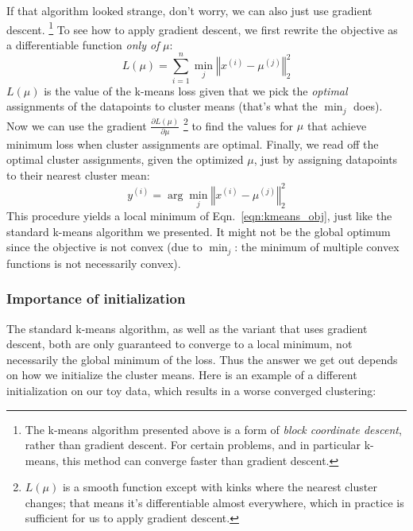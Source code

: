 \documentclass[11pt]{article}
\newcommand{\anchorednote}[2]{ #1 \note{#2} }	%
\newcommand{\note}[1]{\todo[color=blue!10,
  linecolor=blue!90,size=\small]{\linespread{0.9}\selectfont{#1}\par}}
\renewcommand{\note}[1]{\footnote{#1}}
\begin{document}
If that algorithm looked strange, don't worry, we can also just use\anchorednote{gradient descent.}{The k-means algorithm presented above is a form of \textit{block coordinate descent}, rather than gradient descent. For certain problems, and in particular k-means, this method can converge faster than gradient descent.} To see how to apply gradient descent, we first rewrite the objective as a differentiable function \textit{only of} $\mu$:
\begin{equation}
    L(\mu) = \sum_{i=1}^n \min_j \left\Vert x^{(i)} - \mu^{(j)} \right\Vert^2_2
\end{equation}
$L(\mu)$ is the value of the k-means loss given that we pick the \textit{optimal} assignments of the datapoints to cluster means (that's what the $\min_j$ does). Now we can use the gradient\anchorednote{$\frac{\partial L(\mu)}{\partial \mu}$}{$L(\mu)$ is a smooth function except with kinks where the nearest cluster changes; that means it's differentiable almost everywhere, which in practice is sufficient for us to apply gradient descent.} to find the values for $\mu$ that achieve minimum loss when cluster assignments are optimal.
Finally, we read off the optimal cluster assignments, given the optimized $\mu$, just by assigning datapoints to their nearest cluster mean:
\begin{equation}
    y^{(i)} = \arg\min_j \left\Vert x^{(i)} - \mu^{(j)} \right\Vert^2_2
\end{equation}
This procedure yields a local minimum of Eqn.~\ref{eqn:kmeans_obj}, just like the standard k-means algorithm we presented. It might not be the global optimum since the objective is not convex (due to $\min_j$: the minimum of multiple convex functions is not necessarily convex).



\subsubsection{Importance of initialization}
The standard k-means algorithm, as well as the variant that uses gradient descent, both are only guaranteed to converge to a local minimum, not necessarily the global minimum of the loss. Thus the answer we get out depends on how we initialize the cluster means. Here is an example of a different initialization on our toy data, which results in a worse converged clustering:
\end{document}
